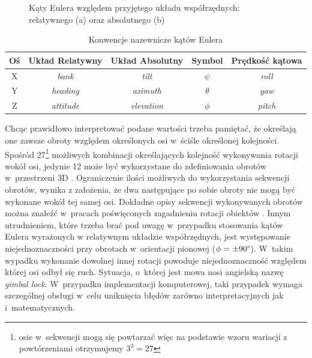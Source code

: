 \begin{savenotes}
\begin{figure}[!htb]
		\caption{Kąty Eulera względem przyjętego układu współrzędnych: relatywnego (a) oraz absolutnego (b)}
		\label{fig:appx:rot:euler}
	\end{figure}
\end{savenotes}
																											
																											
\begin{table}[!htb]
	\centering
	\caption{Konwencje nazewnicze kątów Eulera}
	\label{tab:appx:rot:eulerNames} 
	\begin{tabular}{|c|c|c|c|c|}
		\hline
		Oś & Układ Relatywny & Układ Absolutny & Symbol   & Prędkość kątowa \\
		\hline
		X   & \emph{bank}      & \emph{tilt}      & $\psi$   & \emph{roll}         \\
		Y   & \emph{heading}   & \emph{azimuth}   & $\theta$ & \emph{yaw}          \\ 
		Z   & \emph{attitude}  & \emph{elevation} & $\phi$   & \emph{pitch}        \\
		\hline
	\end{tabular} 
\end{table}
																													
Chcąc prawidłowo interpretować podane wartości trzeba pamiętać, że określają one zawsze obroty względem określonych osi w~ściśle określonej kolejności. Spośród 27\footnote{osie w~sekwencji mogą się powtarzać więc na podstawie wzoru wariacji z powtórzeniami otrzymujemy $3^3 = 27$} możliwych kombinacji określających kolejność wykonywania rotacji wokół osi, jedynie 12 może być wykorzystane do zdefiniowania obrotów w~przestrzeni 3D \cite{Diebel2006}. Ograniczenie ilości możliwych do wykorzystania sekwencji obrotów, wynika z założenia, że dwa następujące po sobie obroty nie mogą być wykonane wokół tej samej osi. Dokładne opisy sekwencji wykonywanych obrotów można znaleźć w~pracach poświęconych zagadnieniu rotacji obiektów \cite{Pio1966, Diebel2006}. Innym utrudnieniem, które trzeba brać pod uwagę w~przypadku stosowania kątów Eulera wyrażonych w relatywnym układzie współrzędnych, jest występowanie niejednoznaczności przy obrotach w~orientacji pionowej ($ \phi=\pm90\degree $). W~takim wypadku wykonanie dowolnej innej rotacji powoduje niejednoznaczność względem której osi odbył się ruch. Sytuacja, o~której jest mowa nosi angielską nazwę \emph{gimbal lock}. W~przypadku implementacji komputerowej, taki przypadek wymaga szczególnej obsługi w~celu uniknięcia błędów zarówno interpretacyjnych jak i~matematycznych.
																													
